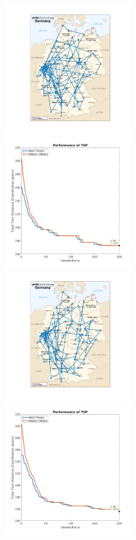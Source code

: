 \documentclass{article}
\begin{document}
		\begin{figure}[h!]
		\includegraphics[width=0.5\textwidth]{img/one_point_30_runs_ind.png}
		\includegraphics[width=0.5\textwidth]{img/one_point_30_runs_fit_med.png}
		\includegraphics[width=0.5\textwidth]{img/two_points_30_runs_ind.png}
		\includegraphics[width=0.5\textwidth]{img/two_points_30_runs_fit_med.png}

\end{figure}
\end{document}
